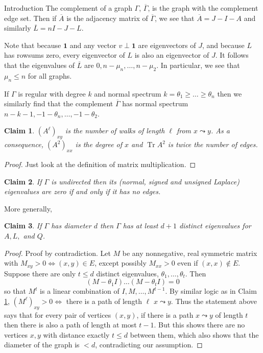 \documentclass{article}
\DeclareMathOperator{\tr}{Tr}
\newtheorem{claim}{Claim}
\begin{document}
\begin{section}{Introduction}
  The complement of a graph $\Gamma$, $\overline \Gamma$, is the graph with the complement edge set.
  Then if $\overline A$ is the adjacency matrix of $\overline \Gamma$, we see that $\overline A = J - I - A$ and similarly $\overline L = nI - J - L$.

  Note that because $\mathbf 1$ and any vector $v \perp \mathbf 1$ are eigenvectors of $J$, and because $L$ has rowsums zero, every eigenvector of $L$ is also an eigenvector of $J$.
  It follows that the eigenvalues of $\overline L$ are $0,n - \mu_n, \ldots, n - \mu_2$.
  In particular, we see that $\mu_n \leq n$ for all graphs.

  If $\Gamma$ is regular with degree $k$ and normal spectrum $k = \theta_1 \geq \ldots \geq \theta_n$ then we similarly find that the complement $\overline \Gamma$ has normal spectrum $n-k-1,-1-\theta_n,\ldots,-1-\theta_2$.


  \begin{claim}\label{num-walks}
    $(A^\ell)_{xy}$ is the number of walks of length $\ell$ from $x \leadsto y$.
    As a consequence, $(A^2)_{xx}$ is the degree of $x$ and $\tr A^2$ is twice the number of edges.
  \end{claim}
  \begin{proof}
    Just look at the definition of matrix multiplication.
  \end{proof}

  \begin{claim}
    If $\Gamma$ is undirected then its (normal, signed and unsigned Laplace) eigenvalues are zero if and only if it has no edges.
  \end{claim}
  More generally,
  \begin{claim}
    If $\Gamma$ has diameter $d$ then $\Gamma$ has at least $d+1$ distinct eigenvalues for $A,L,$ and $Q$.
  \end{claim}
  \begin{proof}
    Proof by contradiction.
    Let $M$ be any nonnegative, real symmetric matrix with $M_{xy} > 0 \iff (x,y) \in E$, except possibly $M_{xx} > 0$ even if $(x,x) \notin E$.
    Suppose there are only $t \leq d$ distinct eigenvalues, $\theta_1,\ldots,\theta_t$.
    Then $$(M-\theta_1I)\ldots(M-\theta_tI) = 0$$ so that $M^t$ is a linear combination of $I,M,\ldots,M^{t-1}$.
    By similar logic as in Claim \ref{num-walks}, $(M^\ell)_{xy} > 0 \iff $ there is a path of length $\ell$ $x \leadsto y$.
    Thus the statement above says that for every pair of vertices $(x,y)$, if there is a path $x \leadsto y$ of length $t$ then there is also a path of length at most $t-1$.
    But this shows there are no vertices $x,y$ with distance exactly $t \leq d$ between them, which also shows that the diameter of the graph is $< d$, contradicting our assumption.
  \end{proof}


\end{section}
\end{document}

